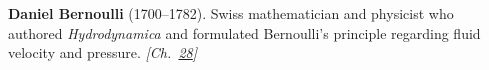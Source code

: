 \textbf{Daniel Bernoulli} (1700–1782). Swiss mathematician and physicist who authored \emph{Hydrodynamica} and formulated Bernoulli's principle regarding fluid velocity and pressure. \emph{[Ch.~\hyperref[ch:negativetemperature]{28}]}


